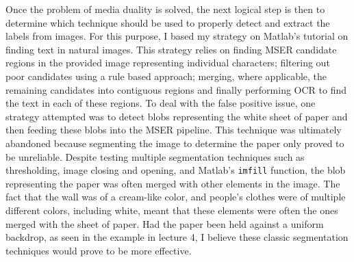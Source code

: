 \documentclass[11pt]{article}
\begin{document}
    Once the problem of media duality is solved, the next logical step is then to determine which technique should be used to properly detect and extract the labels from images. For this purpose, I based my strategy on Matlab's tutorial on finding text in natural images\cite{matlab_mser_ocr}. This strategy relies on finding MSER candidate regions in the provided image representing individual characters; filtering out poor candidates using a rule based approach; merging, where applicable, the remaining candidates into contiguous regions and finally performing OCR to find the text in each of these regions. To deal with the false positive issue, one strategy attempted was to detect blobs representing the white sheet of paper and then feeding these blobs into the MSER pipeline. This technique was ultimately abandoned because segmenting the image to determine the paper only proved to be unreliable. Despite testing multiple segmentation techniques such as thresholding, image closing and opening, and Matlab's \texttt{imfill} function, the blob representing the paper was often merged with other elements in the image. The fact that the wall was of a cream-like color, and people's clothes were of multiple different colors, including white, meant that these elements were often the ones merged with the sheet of paper. Had the paper been held against a uniform backdrop, as seen in the example in lecture 4, I believe these classic segmentation techniques would prove to be more effective.
\end{document}
